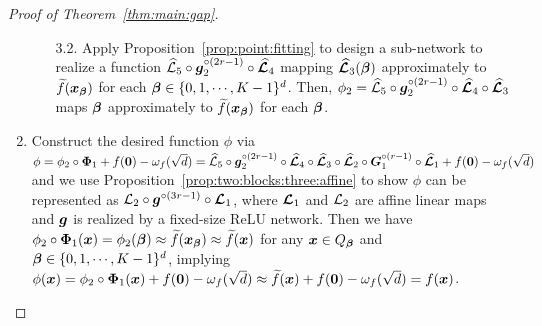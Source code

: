 \documentclass[nohyperref]{article}
\theoremstyle{plain}
\theoremstyle{definition}
\theoremstyle{remark}
\begin{document}
\begin{proof}[Proof of Theorem~\ref{thm:main:gap}]
\begin{enumerate}
\begin{enumerate}
		
		
		\item[3.2.] Apply Proposition~\ref{prop:point:fitting} to design a sub-network to realize a function $\hatcalL_5\circ \bmg_2^{\circ (2r-1)}\circ \bmhatcalL_4$ mapping $\bmhatcalL_3(\bmbeta)$ approximately to $\tildef(\bmx_\bmbeta)$ for each $\bmbeta\in\{0,1,\dotsc,K-1\}^d$. Then, $\phi_2=\hatcalL_5\circ \bmg_2^{\circ (2r-1)}\circ \bmhatcalL_4\circ \bmhatcalL_3$ maps $\bmbeta$ approximately to $\tildef(\bmx_\bmbeta)$ for each $\bmbeta$.
	\end{enumerate}
	
	\item Construct the desired function $\phi$ via $\phi= \phi_2 \circ {\bm{\Phi}}_1 +f({\bm{0}})-\omega_f(\sqrt{d})={\mathcal{\widehat{L}}}_5\circ {\bm{g}}_2^{\circ (2r-1)}\circ {\bm{\mathcal{\widehat{L}}}}_4\circ {\bm{\mathcal{\widehat{L}}}}_3\circ {\bm{\mathcal{\widehat{L}}}}_2\circ {\bm{G}}_1^{\circ (r-1)}\circ {\bm{\mathcal{\widehat{L}}}}_1+f({\bm{0}})-\omega_f(\sqrt{d})$ and we use Proposition~\ref{prop:two:blocks:three:affine} to show $\phi$ can be represented as ${\mathcal{L}}_2\circ {\bm{g}}^{\circ (3r-1)}\circ {\bm{\mathcal{L}}}_1$, where ${\bm{\mathcal{L}}}_1$ and ${\mathcal{L}}_2$ are affine linear maps and ${\bm{g}}$ is realized by a fixed-size ReLU network. Then we have
	$\phi_2 \circ {\bm{\Phi}}_1({\bm{x}})=\phi_2({\bm{\beta}})\approx {\widetilde{f}}({\bm{x}}_{\bm{\beta}})\approx {\widetilde{f}}({\bm{x}})$ for any ${\bm{x}}\in Q_{\bm{\beta}}$ and $\bmbeta\in \{0,1,\dotsc,K-1\}^d$, implying $\phi({\bm{x}})= \phi_2 \circ {\bm{\Phi}}_1({\bm{x}}) +f({\bm{0}})-\omega_f(\sqrt{d})
	\approx {\widetilde{f}}({\bm{x}}) +f({\bm{0}})-\omega_f(\sqrt{d})= f({\bm{x}})$.
\end{enumerate} 



\end{proof}
\end{document}
